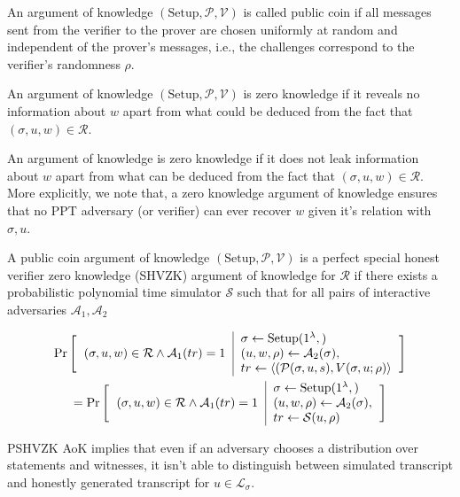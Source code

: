 \begin{defn}
    An argument of knowledge  $(\text{Setup}, \mathcal{P}, \mathcal{V})$ is called public coin if all messages sent from the verifier to the prover are chosen uniformly at random and independent of the prover's messages, i.e., the challenges correspond to the verifier's randomness $\rho$.
\end{defn}

\begin{defn}
    An argument of knowledge $(\text{Setup}, \mathcal{P}, \mathcal{V})$ is zero knowledge if it reveals no information about $w$ apart from what could be deduced from the fact that $(\sigma, u, w) \in \mathcal{R}$.
\end{defn}

An argument of knowledge is zero knowledge if it does not leak information about $w$ apart from what can be deduced from the fact that $(\sigma, u, w) \in \mathcal{R}$. More explicitly, we note that, a zero knowledge argument of knowledge ensures that no \textsf{PPT} adversary (or verifier) can ever recover $w$ given it's relation with $\sigma, u$.

\begin{defn}
    A public coin argument of knowledge $(\text{Setup}, \mathcal{P}, \mathcal{V})$ is a perfect special honest verifier zero knowledge (SHVZK) argument of knowledge for $\mathcal{R}$ if there exists a probabilistic polynomial time simulator $\mathcal{S}$ such that for all pairs of interactive adversaries $\mathcal{A}_1 , \mathcal{A}_2$
    
    \begin{multline*}
    \Pr
    \Bigg[
    \begin{tabular}{c | l}
        \multirow{3}{*}{$(\sigma, u, w) \in \mathcal{R} \wedge \mathcal{A}_1(tr) = 1$}
         & $\sigma \leftarrow \text{Setup}(1^{\lambda},)$
         \\
         & 
         $(u, w, \rho) \leftarrow \mathcal{A}_2(\sigma),$
         \\
         & $tr \leftarrow \langle (\mathcal{P}(\sigma, u, s), V(\sigma, u; \rho) \rangle$
    \end{tabular}
    \Bigg]
    \\
    =\Pr
    \Bigg[
    \begin{tabular}{c | l}
        \multirow{3}{*}{$(\sigma, u, w) \in \mathcal{R} \wedge \mathcal{A}_1(tr) = 1$}
         & $\sigma \leftarrow \text{Setup}(1^{\lambda},)$
         \\
         & 
         $(u, w, \rho) \leftarrow \mathcal{A}_2(\sigma),$
         \\
         & $tr \leftarrow \mathcal{S}(u, \rho)$
    \end{tabular}
    \Bigg]
    \end{multline*}

\end{defn}

PSHVZK AoK implies that even if an adversary chooses a
distribution over statements and witnesses, it isn't able to
distinguish between simulated transcript and honestly generated
transcript for $u \in \mathcal{L}_{\sigma}$.



